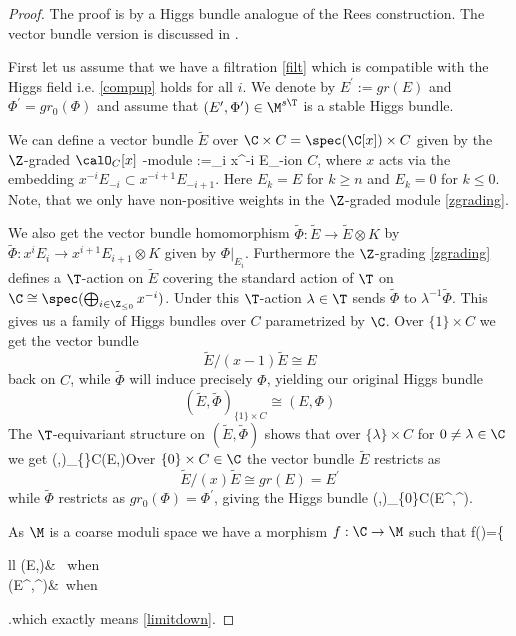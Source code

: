 \begin{proof} The proof is by a Higgs bundle analogue of the Rees construction. The vector bundle version is discussed in \cite{asok,heinloth,halpern}.

	First let us assume that we have a filtration \eqref{filt} which is compatible with the Higgs field i.e. \eqref{compup} holds for all $i$. We denote by $E^\prime:=gr(E)$ and $\Phi^\prime=gr_0(\Phi)$ and assume that $(E^\prime,\Phi^\prime)\in \M^{s\T}$ is a stable Higgs bundle.

	We can define a vector bundle $\tilde{E}$ over $\C\times C=\spec(\C[x])\times C$ given by the $\Z$-graded $\calO_C[x]$ -module \beq \label{zgrading}:=\bigoplus_{i\in \Z} x^{-i} E_{-i}\eeq on $C$, where $x$ acts via the embedding $x^{-i} E_{-i}\subset x^{-i+1} E_{-i+1}$. Here $E_k=E$ for $k\geq n$ and $E_k=0$ for $k\leq 0$. Note, that we only have non-positive weights in the $\Z$-graded module \eqref{zgrading}.

	We also get the vector bundle homomorphism $\tilde{\Phi}:\tilde{E}\to \tilde{E}\otimes K$ by $\tilde{\Phi}:x^i E_i\to x^{i+1} E_{i+1}\otimes K$ given by $\Phi|_{E_i}$. Furthermore the $\Z$-grading \eqref{zgrading} defines a $\T$-action on $\tilde{E}$ covering the standard action of $\T$ on $\C\cong \spec(\bigoplus_{i\in \Z_{\leq 0}} x^{-i})$. Under this $\T$-action $\lambda\in \T$  sends $\tilde{\Phi}$ to $\lambda^{-1}\tilde{\Phi}$.
	This gives us a family of Higgs bundles over $C$ parametrized by $\C$. Over $\{1\}\times C$ we get the vector bundle $$\tilde{E}/(x-1)\tilde{E}\cong E$$ back on $C$, while $\tilde{\Phi}$  will induce precisely $\Phi$, yielding our original Higgs bundle $$(\tilde{E},\tilde{\Phi})_{\{1\}\times C}\cong (E,\Phi)$$
	The $\T$-equivariant structure on $(\tilde{E},\tilde{\Phi})$ shows that over $\{\lambda\}\times C$ for $0\neq\lambda\in\C$ we get \beq\label{etildelambda}(,\tilde{\Phi})_{\{\lambda\}\times C}\cong (E,\lambda\Phi)\eeq Over   $\{0\}\times C\in \C$ the vector bundle $\tilde{E}$ restricts as  $$\tilde{E}/(x)\tilde{E}\cong gr(E)=E^\prime$$ while $\tilde{\Phi}$ restricts as $gr_0(\Phi)=\Phi^\prime$, giving the Higgs bundle \beq\label{etildezero}(,\tilde{\Phi})_{\{0\}\times C}\cong (E^\prime,\Phi^\prime).\eeq
{}

	As $\M$ is a coarse moduli space we have a morphism $f:\C\to \M$ such that \beq \label{fdef}f(\lambda)=\left\{\begin{array}{ll} (E,\lambda\Phi)& \mbox{ when } \lambda{}\\ (E^\prime,\Phi^\prime)&\mbox{ when }  \end{array}\right.\eeq which exactly means \eqref{limitdown}.


\end{proof}
